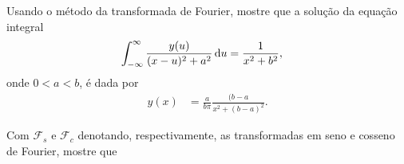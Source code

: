 \documentclass[a4paper,12pt, leqno, answers]{exam}
\begin{document}
\begin{questions}
    \question Usando o m\'{e}todo da transformada de Fourier, mostre que a
    solu\c{c}\~{a}o da equa\c{c}\~{a}o integral
    \begin{align*}
        \int_{-\infty}^\infty \frac{y(u)}{(x - u)^2 + a^2} \, \mathrm{d}u &=
        \frac{1}{x^2 + b^2},
    \end{align*}
    onde $0 < a < b$, \'{e} dada por
    \begin{align*}
        y(x) &= \frac{a}{b \pi} \frac{(b - a}{x^2 + (b - a)^2}.
    \end{align*}
    \begin{solution}
    \end{solution}

    \question Com $\mathcal{F}_s$ e $\mathcal{F}_c$ denotando, respectivamente,
    as transformadas em seno e cosseno de Fourier, mostre que


\end{questions}
\end{document}
